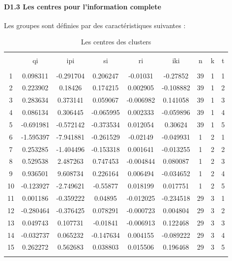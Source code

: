 \documentclass[11pt,]{article}
\let\oldparagraph\paragraph
\renewcommand{\paragraph}[1]{\oldparagraph{#1}\mbox{}}
\begin{document}
\FloatBarrier

\newpage

\hypertarget{d1.3-les-centres-pour-linformation-complete}{%
\paragraph{D1.3 Les centres pour l'information
complete}\label{d1.3-les-centres-pour-linformation-complete}}

Les groupes sont définies par des caractéristiques suivantes :

\FloatBarrier

\begin{table}[!htbp] \centering 
  \caption{Les centres des clusters} 
  \label{} 
\begin{tabular}{@{\extracolsep{5pt}} ccccccccc} 
\\[-1.8ex]\hline 
\hline \\[-1.8ex] 
 & qi & ipi & si & ri & iki & n & k & t \\ 
\hline \\[-1.8ex] 
1 & 0.098311 & -0.291704 & 0.206247 & -0.01031 & -0.27852 & 39 & 1 & 1 \\ 
2 & 0.223902 & 0.18426 & 0.174215 & 0.002905 & -0.108882 & 39 & 1 & 2 \\ 
3 & 0.283634 & 0.373141 & 0.059067 & -0.006982 & 0.141058 & 39 & 1 & 3 \\ 
4 & 0.086134 & 0.306445 & -0.065995 & 0.002333 & -0.059896 & 39 & 1 & 4 \\ 
5 & -0.691981 & -0.572142 & -0.373534 & 0.012054 & 0.30624 & 39 & 1 & 5 \\ 
6 & -1.595397 & -7.941881 & -0.261529 & -0.02149 & -0.049931 & 1 & 2 & 1 \\ 
7 & 0.253285 & -1.404496 & -0.153318 & 0.001641 & -0.013255 & 1 & 2 & 2 \\ 
8 & 0.529538 & 2.487263 & 0.747453 & -0.004844 & 0.080087 & 1 & 2 & 3 \\ 
9 & 0.936501 & 9.608734 & 0.226164 & 0.006494 & -0.034652 & 1 & 2 & 4 \\ 
10 & -0.123927 & -2.749621 & -0.55877 & 0.018199 & 0.017751 & 1 & 2 & 5 \\ 
11 & 0.001186 & -0.359222 & 0.04895 & -0.012025 & -0.234518 & 29 & 3 & 1 \\ 
12 & -0.280464 & -0.376425 & 0.078291 & -0.000723 & 0.004804 & 29 & 3 & 2 \\ 
13 & 0.049743 & 0.107731 & -0.01841 & -0.006913 & 0.122468 & 29 & 3 & 3 \\ 
14 & -0.032737 & 0.065232 & -0.147634 & 0.004155 & -0.089222 & 29 & 3 & 4 \\ 
15 & 0.262272 & 0.562683 & 0.038803 & 0.015506 & 0.196468 & 29 & 3 & 5 \\ 
\hline \\[-1.8ex] 
\end{tabular} 
\end{table}
\end{document}
